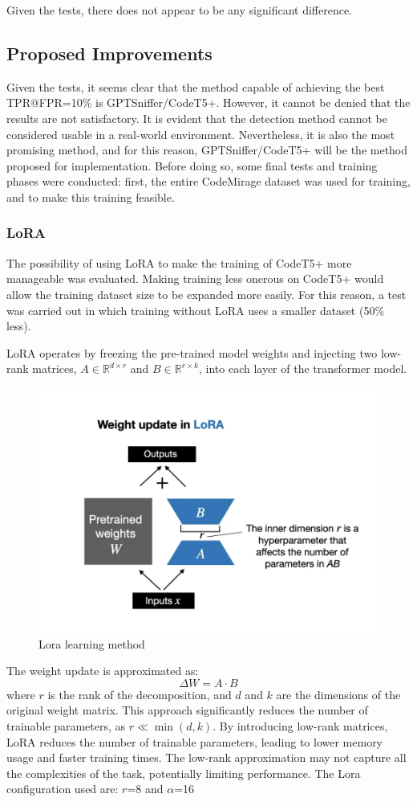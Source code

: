 Given the tests, there does not appear to be any significant difference.





\clearpage
\subsection{Proposed Improvements}
Given the tests, it seems clear that the method capable of achieving 
the best TPR@FPR=10\% is GPTSniffer/CodeT5+. However, it cannot be denied 
that the results are not satisfactory. It is evident that the detection 
method cannot be considered usable in a real-world environment. Nevertheless, 
it is also the most promising method, and for this reason, GPTSniffer/CodeT5+ 
will be the method proposed for implementation. Before doing so, some final 
tests and training phases were conducted: first, the entire CodeMirage 
dataset was used for training, and to make this training feasible.

\subsubsection{LoRA}
The possibility of using LoRA to make the training of CodeT5+ 
more manageable was evaluated.
Making training less onerous on CodeT5+ would allow the training 
dataset size to be expanded more easily. For this reason, a test was 
carried out in which training without LoRA uses a smaller dataset (50\% less).

LoRA operates by freezing the pre-trained model weights and injecting 
two low-rank matrices, \( A \in \mathbb{R}^{d \times r} \) and 
\( B \in \mathbb{R}^{r \times k} \), into each layer of the 
transformer model.

\begin{figure}[H]
    \centering
    \includegraphics[width=0.5\linewidth]{img/Lora.png}
    \caption{Lora learning method}
    \label{fig:Lora}
\end{figure}
 The weight update is approximated as:
\[
\Delta W = A \cdot B
\]
where \( r \) is the rank of the decomposition, and \( d \) 
and \( k \) are the dimensions of the original weight matrix. 
This approach significantly reduces the number of trainable parameters, 
as \( r \ll \min(d, k) \).
By introducing low-rank matrices, LoRA reduces the number of trainable 
parameters, leading to lower memory usage and faster training times.
The low-rank approximation may not capture all the complexities of the task, 
potentially limiting performance.
The Lora configuration used are: $r$=8 and $\alpha$=16


